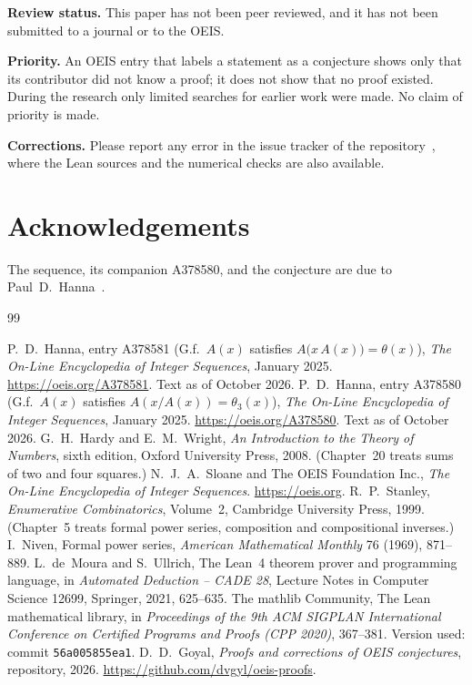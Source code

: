 \documentclass[11pt,a4paper]{article}
\theoremstyle{definition}
\theoremstyle{remark}
\newcommand{\para}[1]{\par\medskip\noindent\textbf{#1}\enspace}
\begin{document}
\para{Review status.} This paper has not been peer reviewed, and it has not been submitted to a journal or to the OEIS.

\para{Priority.} An OEIS entry that labels a statement as a conjecture shows only that its contributor did not know
a proof; it does not show that no proof existed. During the research only limited searches for earlier work were
made. No claim of priority is made.

\para{Corrections.} Please report any error in the issue tracker of the repository~\cite{repo}, where the Lean sources and the numerical checks are also
available.

\section*{Acknowledgements}
The sequence, its companion A378580, and the conjecture are due to Paul~D.~Hanna~\cite{oeis,oeisother}.

\begin{thebibliography}{99}\small
\raggedright
{} P.~D.~Hanna, entry A378581 (G.f.\ $A(x)$ satisfies $A\bigl(x\,A(x)\bigr)=\theta(x)$), \emph{The On-Line Encyclopedia of Integer Sequences}, January 2025. \url{https://oeis.org/A378581}. Text as of October 2026.
 P.~D.~Hanna, entry A378580 (G.f.\ $A(x)$ satisfies $A(x/A(x))=\theta_3(x)$), \emph{The On-Line Encyclopedia of Integer Sequences}, January 2025. \url{https://oeis.org/A378580}. Text as of October 2026.
 G.~H.~Hardy and E.~M.~Wright, \emph{An Introduction to the Theory of Numbers}, sixth edition, Oxford University Press, 2008. (Chapter~20 treats sums of two and four squares.)
 N.~J.~A.~Sloane and The OEIS Foundation Inc., \emph{The On-Line Encyclopedia of Integer Sequences}. \url{https://oeis.org}.
 R.~P.~Stanley, \emph{Enumerative Combinatorics}, Volume~2, Cambridge University Press, 1999. (Chapter~5 treats formal power series, composition and compositional inverses.)
 I.~Niven, Formal power series, \emph{American Mathematical Monthly} 76 (1969), 871--889.
 L.~de~Moura and S.~Ullrich, The Lean~4 theorem prover and programming language, in \emph{Automated Deduction -- CADE 28}, Lecture Notes in Computer Science 12699, Springer, 2021, 625--635.
 The mathlib Community, The Lean mathematical library, in \emph{Proceedings of the 9th ACM SIGPLAN International Conference on Certified Programs and Proofs (CPP 2020)}, 367--381. Version used: commit \texttt{56a005855ea1}.
 D.~D.~Goyal, \emph{Proofs and corrections of OEIS conjectures}, repository, 2026. \url{https://github.com/dvgyl/oeis-proofs}.
\end{thebibliography}
\end{document}
